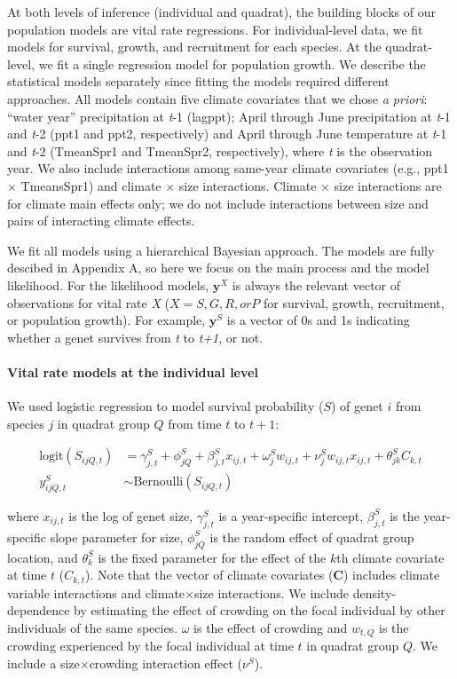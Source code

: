 \documentclass[12pt,]{article}
\begin{document}
At both levels of inference (individual and quadrat), the building
blocks of our population models are vital rate regressions. For
individual-level data, we fit models for survival, growth, and
recruitment for each species. At the quadrat-level, we fit a single
regression model for population growth. We describe the statistical
models separately since fitting the models required different
approaches. All models contain five climate covariates that we chose
\emph{a priori}: ``water year'' precipitation at \emph{t}-1 (lagppt);
April through June precipitation at \emph{t}-1 and \emph{t}-2 (ppt1 and
ppt2, respectively) and April through June temperature at \emph{t}-1 and
\emph{t}-2 (TmeanSpr1 and TmeanSpr2, respectively), where \emph{t} is
the observation year. We also include interactions among same-year
climate covariates (e.g., ppt1 $\times$ TmeansSpr1) and climate $\times$
size interactions. Climate $\times$ size interactions are for climate
main effects only; we do not include interactions between size and pairs
of interacting climate effects.

We fit all models using a hierarchical Bayesian approach. The models are
fully descibed in Appendix A, so here we focus on the main process and
the model likelihood. For the likelihood models, $\textbf{y}^X$ is
always the relevant vector of observations for vital rate \emph{X}
($X = S, G, R, or P$ for survival, growth, recruitment, or population
growth). For example, $\textbf{y}^S$ is a vector of 0s and 1s indicating
whether a genet survives from \emph{t} to \emph{t+1}, or not.

\paragraph{Vital rate models at the individual
level}\label{vital-rate-models-at-the-individual-level}

We used logistic regression to model survival probability ($S$) of genet
$i$ from species $j$ in quadrat group $Q$ from time $t$ to $t+1$:

\begin{align}
\text{logit}(S_{ijQ,t}) &= \gamma^{S}_{j,t} + \phi^{S}_{jQ} + \beta^{S}_{j,t}x_{ij,t} + \omega^{S}_{j}w_{ij,t} + \nu^{S}_{j}w_{ij,t}x_{ij,t} + \theta^{S}_{jk}C_{k,t} \\
y^{S}_{ijQ,t} &\sim \text{Bernoulli}(S_{ijQ,t})
\end{align}

where $x_{ij,t}$ is the log of genet size, $\gamma^{S}_{j,t}$ is a
year-specific intercept, $\beta^{S}_{j,t}$ is the year-specific slope
parameter for size, $\phi^{S}_{jQ}$ is the random effect of quadrat
group location, and $\theta^{S}_{k}$ is the fixed parameter for the
effect of the $k$th climate covariate at time $t$ ($C_{k,t}$). Note that
the vector of climate covariates (\textbf{C}) includes climate variable
interactions and climate$\times$size interactions. We include
density-dependence by estimating the effect of crowding on the focal
individual by other individuals of the same species. $\omega$ is the
effect of crowding and $w_{t,Q}$ is the crowding experienced by the
focal individual at time $t$ in quadrat group $Q$. We include a
size$\times$crowding interaction effect ($\nu^{S}$).
\end{document}
